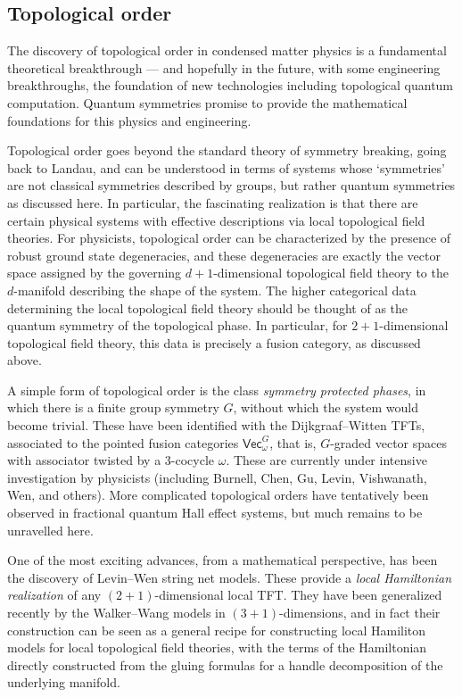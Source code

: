 \documentclass[12pt]{article}
\begin{document}
\subsection{Topological order}
The discovery of topological order in condensed matter physics is a
fundamental theoretical breakthrough --- and hopefully in the future, with
some engineering breakthroughs, the foundation of new technologies including
topological quantum computation. Quantum symmetries promise to provide the
mathematical foundations for this physics and engineering.

Topological order goes beyond the standard theory of symmetry breaking, going
back to Landau, and can be understood in terms of systems whose `symmetries'
are not classical symmetries described by groups, but rather quantum
symmetries as discussed here. In particular, the fascinating realization is
that there are certain physical systems with effective descriptions via local
topological field theories. For physicists, topological order can be
characterized by the presence of robust ground state degeneracies, and these
degeneracies are exactly the vector space assigned by the governing
$d+1$-dimensional topological field theory to the $d$-manifold describing the
shape of the system. The higher categorical data determining the local
topological field theory should be thought of as the quantum symmetry of the
topological phase. In particular, for $2+1$-dimensional topological field
theory, this data is precisely a fusion category, as discussed above.

A simple form of topological order is the class \emph{symmetry protected phases}, in which there is a finite group symmetry $G$, without which the system would become trivial. These have been identified with the Dijkgraaf--Witten TFTs, associated to the pointed fusion categories $\mathsf{Vec}_\omega^G$, that is, $G$-graded vector spaces with associator twisted by a 3-cocycle $\omega$. These are currently under intensive investigation by physicists (including Burnell, Chen, Gu, Levin, Vishwanath, Wen, and others). More complicated topological orders have tentatively been observed in fractional quantum Hall effect systems, but much remains to be unravelled here.

One of the most exciting advances, from a mathematical perspective, has been the discovery of Levin--Wen string net models. These provide a \emph{local Hamiltonian realization} of any $(2+1)$-dimensional local TFT. They have been generalized recently by the Walker--Wang models in $(3+1)$-dimensions, and in fact their construction can be seen as a general recipe for constructing local Hamiliton models for local topological field theories, with the terms of the Hamiltonian directly constructed from the gluing formulas for a handle decomposition of the underlying manifold.
\end{document}
